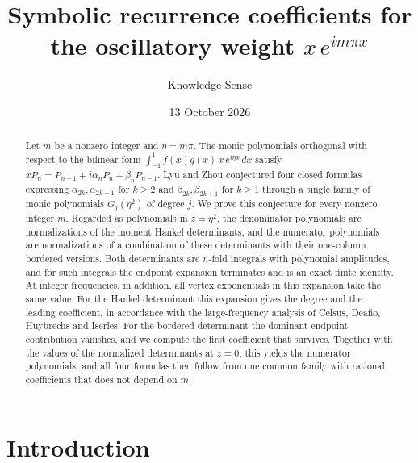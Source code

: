 \documentclass[11pt]{amsart}
\theoremstyle{remark}
\numberwithin{equation}{section}
\begin{document}
\DeclareRobustCommand{\theweight}{\ensuremath{x\,e^{im\pi x}}}
\title[Recurrence coefficients for \theweight]{Symbolic recurrence coefficients for the oscillatory weight \texorpdfstring{\theweight}{x exp(i m pi x)}}

\author{Knowledge Sense}

\date{13 October 2026}



\begin{abstract}
Let $m$ be a nonzero integer and $\eta=m\pi$. The monic polynomials orthogonal with respect to the bilinear form $\int_{-1}^{1}f(x)g(x)\,x\,e^{i\eta x}\,dx$ satisfy $xP_n=P_{n+1}+i\alpha_nP_n+\beta_nP_{n-1}$. Lyu and Zhou conjectured four closed formulas expressing $\alpha_{2k},\alpha_{2k+1}$ for $k\ge2$ and $\beta_{2k},\beta_{2k+1}$ for $k\ge1$ through a single family of monic polynomials $G_j(\eta^2)$ of degree $j$. We prove this conjecture for every nonzero integer $m$. Regarded as polynomials in $z=\eta^2$, the denominator polynomials are normalizations of the moment Hankel determinants, and the numerator polynomials are normalizations of a combination of these determinants with their one-column bordered versions. Both determinants are $n$-fold integrals with polynomial amplitudes, and for such integrals the endpoint expansion terminates and is an exact finite identity. At integer frequencies, in addition, all vertex exponentials in this expansion take the same value. For the Hankel determinant this expansion gives the degree and the leading coefficient, in accordance with the large-frequency analysis of Celsus, Deaño, Huybrechs and Iserles. For the bordered determinant the dominant endpoint contribution vanishes, and we compute the first coefficient that survives. Together with the values of the normalized determinants at $z=0$, this yields the numerator polynomials, and all four formulas then follow from one common family with rational coefficients that does not depend on $m$.
\end{abstract}

\maketitle

\section{Introduction}
\end{document}
